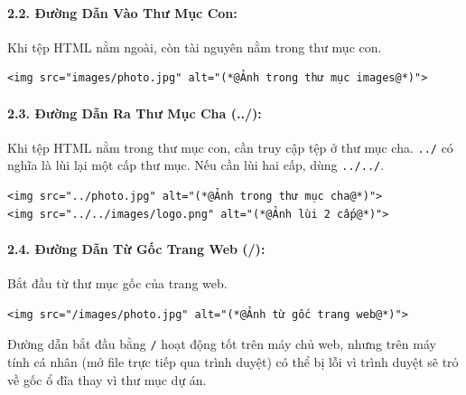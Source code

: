 \documentclass[11pt,oneside]{book}
\newcommand{\codeinline}[1]{\textcolor{accentOrange}{\texttt{#1}}}
\begin{document}
\paragraph{2.2. Đường Dẫn Vào Thư Mục Con:}
Khi tệp HTML nằm ngoài, còn tài nguyên nằm trong thư mục con.

\begin{codeWindow}
\begin{lstlisting}[language=HTML5]
<img src="images/photo.jpg" alt="(*@Ảnh trong thư mục images@*)">
\end{lstlisting}
\end{codeWindow}

\paragraph{2.3. Đường Dẫn Ra Thư Mục Cha (../):}
Khi tệp HTML nằm trong thư mục con, cần truy cập tệp ở thư mục cha. \codeinline{../} có nghĩa là lùi lại một cấp thư mục. Nếu cần lùi hai cấp, dùng \codeinline{../../}.

\begin{codeWindow}
\begin{lstlisting}[language=HTML5]
<img src="../photo.jpg" alt="(*@Ảnh trong thư mục cha@*)">
<img src="../../images/logo.png" alt="(*@Ảnh lùi 2 cấp@*)">
\end{lstlisting}
\end{codeWindow}

\paragraph{2.4. Đường Dẫn Từ Gốc Trang Web (/):}
Bắt đầu từ thư mục gốc của trang web.

\begin{codeWindow}
\begin{lstlisting}[language=HTML5]
<img src="/images/photo.jpg" alt="(*@Ảnh từ gốc trang web@*)">
\end{lstlisting}
\end{codeWindow}

\begin{noteBox}
Đường dẫn bắt đầu bằng \codeinline{/} hoạt động tốt trên máy chủ web, nhưng trên máy tính cá nhân (mở file trực tiếp qua trình duyệt) có thể bị lỗi vì trình duyệt sẽ trỏ về gốc ổ đĩa thay vì thư mục dự án.
\end{noteBox}
\end{document}
